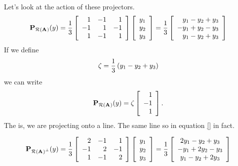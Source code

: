 Let's look at the action of these projectors.
\begin{equation}
  \projra(y) = \rthree
    \mat{rrr}
    { 1 & -1 &  1\\
     -1 &  1 & -1\\
      1 & -1 &  1}
    \mat{c}{y_{1}\\y_{2}\\y_{3}}
    = \rthree \mat{r}{y_{1}-y_{2}+y_{3}\\-y_{1}+y_{2}-y_{3}\\y_{1}-y_{2}+y_{3}}
\end{equation}
If we define
\begin{equation}
  \zeta = \rthree \paren{y_{1}-y_{2}+y_{3}}
\end{equation}
we can write
\begin{equation}
  \projra(y) = \zeta\mat{r}{1\\-1\\1}.
\end{equation}
The is, we are projecting onto a line. The same line so in equation \eqref{} in fact.

\begin{equation}
  \projrap(y) = \rthree
    \mat{rrr}
    { 2 & -1 &  1\\
     -1 &  2 & -1\\
      1 & -1 &  2}
    \mat{c}{y_{1}\\y_{2}\\y_{3}}
    = \rthree \mat{c}{2y_{1}-y_{2}+y_{3}\\-y_{1}+2y_{2}-y_{3}\\y_{1}-y_{2}+2y_{3}}
\end{equation}




	
\endinput